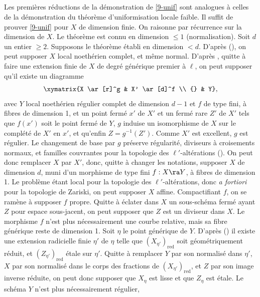 \documentclass[10pt]{../fichiers-configuration-latex/smfart}
\begin{document}
\subsection{}\label{9-réductions} Les premières réductions de la démonstration de \ref{9-unif} sont
analogues à celles de la démonstration du théorème d'uniformisation locale faible. Il suffit de
prouver \ref{9-unif} pour $X$ de dimension finie. On raisonne par récurrence sur la dimension de
$X$. Le théorème est connu en dimension $\le 1$ (normalisation). Soit $d$ un entier $\ge 2$.
Supposons le théorème établi en dimension $< d$. D'après (), on peut supposer
$X$ local noethérien complet, et même normal. D'après , quitte à faire une extension finie de $X$ de degré générique premier à
$\ell$, on peut supposer qu'il existe un diagramme $$ \xymatrix{X \ar[r]^g & X' \ar[d]^f \\ {} & Y},
$$ avec $Y$ local noethérien régulier complet de dimension $d-1$ et $f$ de type fini, à fibres de
dimension 1, et un point fermé $x'$ de $X'$ et un fermé rare $Z'$ de $X'$ tels que $f(x')$ soit le
point fermé de $Y$, $g$ induise un isomorphisme de $X$ sur le complété de $X'$ en $x'$, et qu'enfin
$Z = g^{-1}(Z')$. Comme $X'$ est excellent, $g$ est régulier. Le changement de base par $g$ préserve
régularité, diviseurs à croisements normaux, et familles couvrantes pour la topologie des
$\ell'$-altérations ().  On peut donc remplacer $X$ par $X'$, donc,
quitte à changer les notations, supposer $X$ de dimension $d$, muni d'un morphisme de type fini $f :
X \ra Y$, à fibres de dimension 1. Le problème étant local pour la topologie des
$\ell'$-altérations, donc \textit{a fortiori} pour la topologie de Zariski, on peut supposer $X$
affine. Compactifiant $f$, on se ramène à supposer $f$ propre. Quitte à éclater dans $X$ un
sous-schéma fermé ayant $Z$ pour espace sous-jacent, on peut supposer que $Z$ est un diviseur dans
$X$. Le morphisme $f$ n'est plus nécessairement une courbe relative, mais sa fibre générique reste
de dimension 1. Soit $\eta$ le point générique de $Y$. D'après () il existe une
extension radicielle finie $\eta'$ de $\eta$ telle que $(X_{\eta'})_{\mathrm{red}}$ soit
géométriquement réduit, et $(Z_{\eta'})_{\mathrm{red}}$ étale sur $\eta'$. Quitte à remplacer $Y$
par son normalisé dans $\eta'$, $X$ par son normalisé dans le corps des fractions de
$(X_{\eta'})_{\mathrm{red}}$, et $Z$ par son image inverse réduite, on peut donc supposer que
$X_{\eta}$ est lisse et que $Z_{\eta}$ est étale. Le schéma $Y$ n'est plus nécessairement régulier,
\end{document}
